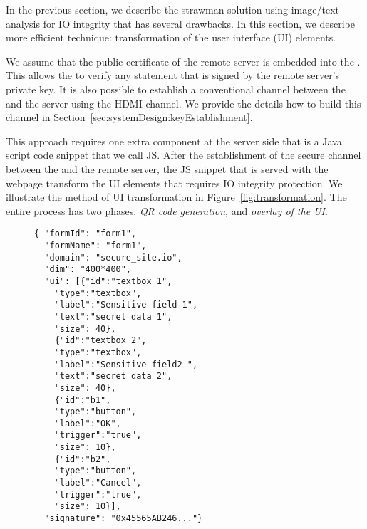 In the previous section, we describe the strawman solution using image/text analysis for IO integrity that has several drawbacks. In this section, we describe more efficient technique: transformation of the user interface (UI) elements.

We assume that the public certificate of the remote server is embedded into the \device. This allows the \device to verify any statement that is signed by the remote server's private key. It is also possible to establish a conventional \tls channel between the \device and the server using the HDMI channel. We provide the details how to build this \tls channel in Section~\ref{sec:systemDesign:keyEstablishment}.

This approach requires one extra component at the server side that is a Java script code snippet that we call \name JS. After the establishment of the secure channel between the \device and the remote server, the \name JS snippet that is served with the webpage transform the UI elements that requires IO integrity protection. We illustrate the method of UI transformation in Figure~\ref{fig:transformation}. The entire process has two phases: \emph{QR code generation}, and \emph{overlay of the UI}.



\begin{figure}[t]
\begin{lstlisting}[mathescape=true]
{ "formId": "form1",
  "formName": "form1",
  "domain": "secure_site.io",
  "dim": "400*400",
  "ui": [{"id":"textbox_1",
  	"type":"textbox",
	"label":"Sensitive field 1",
	"text":"secret data 1",
	"size": 40},
	{"id":"textbox_2",
	"type":"textbox",
	"label":"Sensitive field2 ",
	"text":"secret data 2",
	"size": 40},
	{"id":"b1",
	"type":"button",
	"label":"OK",
	"trigger":"true",
	"size": 10},	
	{"id":"b2",
	"type":"button",
	"label":"Cancel",
	"trigger":"true",
	"size": 10}],
  "signature": "0x45565AB246..."}
\end{lstlisting}
\end{figure}

% 


